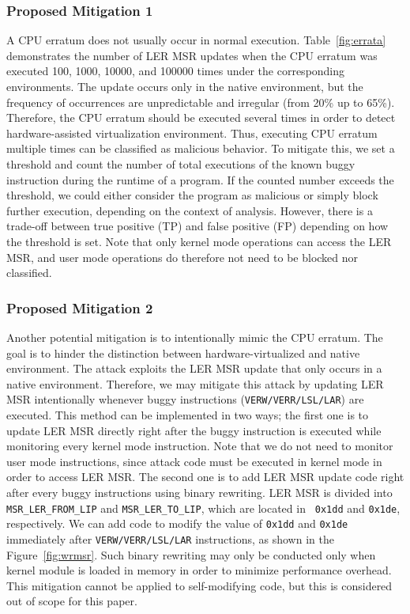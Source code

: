 \subsubsection{Proposed Mitigation 1}
A CPU erratum does not usually occur in normal execution. Table~\ref{fig:errata}
demonstrates the number of LER MSR updates when the CPU erratum was executed
100, 1000, 10000, and 100000 times under the corresponding environments. The
update occurs only in the native environment, but the frequency of occurrences
are unpredictable and irregular (from 20\% up to 65\%). Therefore, the CPU
erratum should be executed several times in order to detect hardware-assisted
virtualization environment. Thus, executing CPU erratum multiple times can be
classified as malicious behavior. To mitigate this, we set a threshold and count
the number of total executions of the known buggy instruction during the runtime
of a program. If the counted number exceeds the threshold, we could either
consider the program as malicious or simply block further execution, depending
on the context of analysis. However, there is a trade-off between true positive
(TP) and false positive (FP) depending on how the threshold is set. Note that
only kernel mode operations can access the LER MSR, and user mode operations do
therefore not need to be blocked nor classified.

\subsubsection{Proposed Mitigation 2}
Another potential mitigation is to intentionally mimic the CPU erratum. The goal
is to hinder the distinction between hardware-virtualized and native
environment. The attack exploits the LER MSR update that only occurs in a native
environment. Therefore, we may mitigate this attack by updating LER MSR
intentionally whenever buggy instructions (\texttt{VERW/VERR/LSL/LAR}) are
executed. This method can be implemented in two ways; the first one is to update
LER MSR directly right after the buggy instruction is executed while monitoring
every kernel mode instruction. Note that we do not need to monitor user mode
instructions, since attack code must be executed in kernel mode in order to
access LER MSR. The second one is to add LER MSR update code right after every
buggy instructions using binary rewriting. LER MSR is divided into {\tt
  MSR\_LER\_FROM\_LIP} and {\tt MSR\_LER\_TO\_LIP}, which are located in {\tt
  0x1dd} and {\tt 0x1de}, respectively. We can add code to modify the value of
{\tt 0x1dd} and {\tt 0x1de} immediately after \texttt{VERW/VERR/LSL/LAR}
instructions, as shown in the Figure~\ref{fig:wrmsr}. Such binary rewriting may
only be conducted only when kernel module is loaded in memory in order to
minimize performance overhead. This mitigation cannot be applied to
self-modifying code, but this is considered out of scope for this paper.


